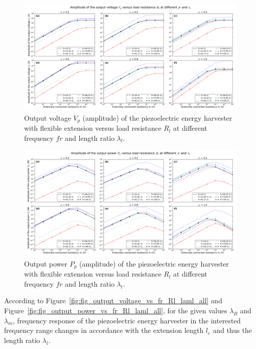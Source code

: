 \documentclass{elsarticle}
\begin{document}
\begin{figure}[!htbp]
    \centering
    \includegraphics[width=\textwidth]{./fig_vol_laml_list_vs_fr_Rl}
    \caption{Output voltage $V_p$ (amplitude) of the piezoelectric energy harvester with flexible extension versus load resistance $R_l$ at different frequency $fr$ and length ratio $\lambda_l$. }
    \label{fig:fig_vol_laml_list_vs_fr_Rl}
\end{figure}

\begin{figure}[!htbp]
    \centering
    \includegraphics[width=\textwidth]{./fig_pow_laml_list_vs_fr_Rl}
    \caption{Output power $P_p$ (amplitude) of the piezoelectric energy harvester with flexible extension versus load resistance $R_l$ at different frequency $fr$ and length ratio $\lambda_l$. }
    \label{fig:fig_pow_laml_list_vs_fr_Rl}
\end{figure}


According to Figure~\ref{fig:fig_output_voltage_vs_fr_Rl_laml_all} and Figure~\ref{fig:fig_output_power_vs_fr_Rl_laml_all}, for the given values $\lambda_B$ and $\lambda_m$, frequency response of the piezoelectric energy harvester in the interested frequency range changes in accordance with the extension length $l_e$ and thus the length ratio $\lambda_l$. 
\end{document}
